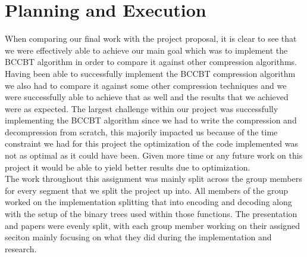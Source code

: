 \documentclass[12pt]{IEEEtran}
\begin{document}
\section{Planning and Execution}

When comparing our final work with the project proposal, it is clear to see that we were effectively able
to achieve our main goal which was to implement the BCCBT algorithm in order to compare it against other
compression algorithms.  Having been able to successfully implement the BCCBT compression algorithm we 
also had to compare it against some other compression techniques and we were successfully able to achieve 
that as well and the results that we achieved were as expected.  The largest challenge within our
project was successfully implementing the BCCBT algorithm since we had to write the compression and 
decompression from scratch, this majorily impacted us because of the time constraint we had for this 
project the optimization of the code implemented was not as optimal as it could have been.  Given more 
time or any future work on this project it would be able to yield better results due to optimization.\\

The work throughout this assignment was mainly split across the group members for every segment that 
we split the project up into.  All members of the group worked on the implementation splitting that 
into encoding and decoding along with the setup of the binary trees used within those functions.  The 
presentation and papers were evenly split, with each group member working on their assigned seciton mainly
focusing on what they did during the implementation and research.




\end{document}
